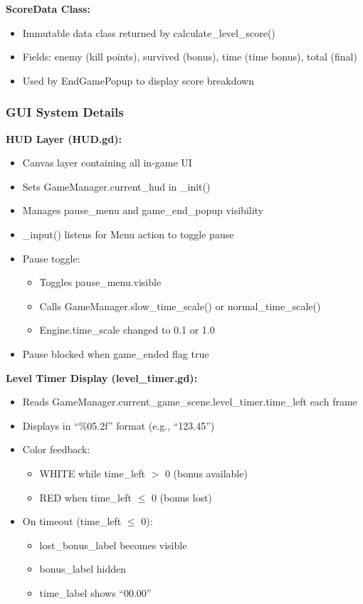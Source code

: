 \documentclass{article}
\begin{document}
\textbf{ScoreData Class:}
\begin{itemize}
    \item Immutable data class returned by calculate\_level\_score()
    \item Fields: enemy (kill points), survived (bonus), time (time bonus), total (final)
    \item Used by EndGamePopup to display score breakdown
\end{itemize}

\subsubsection{GUI System Details}

\textbf{HUD Layer (HUD.gd):}
\begin{itemize}
    \item Canvas layer containing all in-game UI
    \item Sets GameManager.current\_hud in \_init()
    \item Manages pause\_menu and game\_end\_popup visibility
    \item \_input() listens for Menu action to toggle pause
    \item Pause toggle: 
    \begin{itemize}
        \item Toggles pause\_menu.visible
        \item Calls GameManager.slow\_time\_scale() or normal\_time\_scale()
        \item Engine.time\_scale changed to 0.1 or 1.0
    \end{itemize}
    \item Pause blocked when game\_ended flag true
\end{itemize}

\textbf{Level Timer Display (level\_timer.gd):}
\begin{itemize}
    \item Reads GameManager.current\_game\_scene.level\_timer.time\_left each frame
    \item Displays in ``\%05.2f'' format (e.g., ``123.45'')
    \item Color feedback:
    \begin{itemize}
        \item WHITE while time\_left $>$ 0 (bonus available)
        \item RED when time\_left $\leq$ 0 (bonus lost)
    \end{itemize}
    \item On timeout (time\_left $\leq$ 0):
    \begin{itemize}
        \item lost\_bonus\_label becomes visible
        \item bonus\_label hidden
        \item time\_label shows ``00.00''
    \end{itemize}
\end{itemize}
\end{document}
